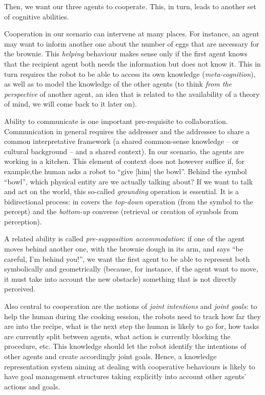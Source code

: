 \documentclass[a4paper, twocolumn]{article}
\begin{document}
Then, we want our three agents to cooperate. This, in turn, leads to another
set of cognitive abilities.

Cooperation in our scenario can intervene at many places. For instance, an
agent may want to inform another one about the number of eggs that are
necessary for the brownie. This \emph{helping} behaviour makes sense only if
the first agent knows that the recipient agent both needs the information but
does not know it. This in turn requires the robot to be able to access its own
knowledge (\emph{meta-cognition}), as well as to model the knowledge of the
other agents (to think \emph{from the perspective} of another agent, an idea
that is related to the availability of a theory of mind, we will come back to
it later on).

Ability to communicate is one important pre-requisite to collaboration.
Communication in general requires the addresser and the addressee to share a
common interpretative framework (a shared common-sense knowledge -- or cultural
background -- and a shared context). In our scenario, the agents are working in
a kitchen. This element of context does not however suffice if, for example,the 
human asks a robot to ``give {[him]} the bowl''. Behind the symbol
``bowl'', which physical entity are we actually talking about? If we want to
talk and act on the world, this so-called \emph{grounding} operation is
essential. It is a bidirectional process: in covers the {\it top-down}
operation (from the symbol to the percept) and the {\it bottom-up} converse
(retrieval or creation of symbols from perception).

A related ability is called \emph{pre-supposition accommodation}: if one of the
agent moves behind another one, with the brownie dough in its arm, and says
``be careful, I'm behind you!'', we want the first agent to be able to
represent both symbolically and geometrically (because, for instance, if the
agent want to move, it must take into account the new obstacle) something that
is not directly perceived.

Also central to cooperation are the notions of \emph{joint intentions} and
\emph{joint goals}: to help the human during the cooking session, the robots
need to track how far they are into the recipe, what is the next step the human
is likely to go for, how tasks are currently split between agents, what action
is currently blocking the procedure, etc. This knowledge should let the robot
identify the intentions of other agents and create accordingly joint goals.
Hence, a knowledge representation system aiming at dealing with cooperative
behaviours is likely to have goal management structures taking explicitly into
account other agents' actions and goals.
\end{document}
